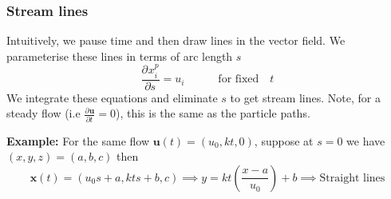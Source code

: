 \documentclass[11pt]{article}
\newcommand*{\pd}[3][]{\ensuremath{\frac{\partial^{#1} {#2}}{\partial {#3}^{#1}}}}
\newcommand{\mv}[1]{\bm{#1}}
\newenvironment{eg}
{\begin{mdframed}[backgroundcolor=mylg, roundcorner=5pt, linewidth=0pt]\textbf{Example: }\normalfont}
    {\end{mdframed}}
\begin{document}
\subsubsection{Stream lines}
Intuitively, we pause time and then draw lines in the vector field. We parameterise these lines in terms of arc length $s$
$$\pd{x_i^p}{s}=u_i \quad\quad\quad \text{for fixed} \quad t$$
We integrate these equations and eliminate $s$ to get stream lines. Note, for a steady flow (i.e $\pd{\mv{u}}{t}=0$), this is the same as the particle paths. 
\begin{eg}
For the same flow $\mv{u}(t)=(u_0,kt,0)$, suppose at $s=0$ we have $(x,y,z)=(a,b,c)$ then
$$\mv{x}(t)=(u_0s+a,kts+b,c)\implies y=kt\left(\frac{x-a}{u_0}\right)+b\implies\text{Straight lines}$$
\end{eg}
\end{document}

